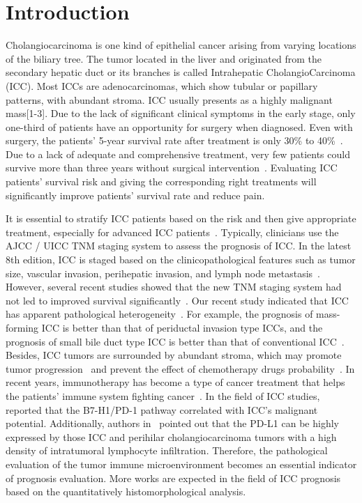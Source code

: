 \documentclass[num-refs]{wiley-article}
\begin{document}
\section{Introduction}

Cholangiocarcinoma is one kind of epithelial cancer arising from varying locations of the biliary tree. The tumor located in the liver and originated from the secondary hepatic duct or its branches is called Intrahepatic CholangioCarcinoma (ICC). Most ICCs are adenocarcinomas, which show tubular or papillary patterns, with abundant stroma. ICC usually presents as a highly malignant mass[1-3]. Due to the lack of significant clinical symptoms in the early stage, only one-third of patients have an opportunity for surgery when diagnosed. Even with surgery, the patients' 5-year survival rate after treatment is only 30\% to 40\%~\cite{mavros2014treatment, mazzaferro2020liver}. Due to a lack of adequate and comprehensive treatment, very few patients could survive more than three years without surgical intervention~\cite{kelley2020systemic}. Evaluating ICC patients' survival risk and giving the corresponding right treatments will significantly improve patients' survival rate and reduce pain.

It is essential to stratify ICC patients based on the risk and then give appropriate treatment, especially for advanced ICC patients~\cite{lunsford2018liver}. Typically, clinicians use the AJCC / UICC TNM staging system to assess the prognosis of ICC. In the latest 8th edition, ICC is staged based on the clinicopathological features such as tumor size, vascular invasion, perihepatic invasion, and lymph node metastasis~\cite{lunsford2018liver}. However, several recent studies showed that the new TNM staging system had not led to improved survival significantly~\cite{kang2018prognostic,kim2017evaluation}. Our recent study indicated that ICC has apparent pathological heterogeneity~\cite{chen2017clinicopathological}. For example, the prognosis of mass-forming ICC is better than that of periductal invasion type ICCs, and the prognosis of small bile duct type ICC is better than that of conventional ICC~\cite{chen2017clinicopathological,yu2011viral}. Besides, ICC tumors are surrounded by abundant stroma, which may promote tumor progression~\cite{mertens2013therapeutic} and prevent the effect of chemotherapy drugs probability~\cite{hogdall2018desmoplastic}. In recent years, immunotherapy has become a type of cancer treatment that helps the patients' immune system fighting cancer~\cite{2018A}. In the field of ICC studies, \cite{Ye2010Interaction} reported that the B7-H1/PD-1 pathway correlated with ICC's malignant potential.
Additionally, authors in~\cite{2017PD} pointed out that the PD-L1 can be highly expressed by those ICC and perihilar cholangiocarcinoma tumors with a high density of intratumoral lymphocyte infiltration. Therefore, the pathological evaluation of the tumor immune microenvironment becomes an essential indicator of prognosis evaluation. More works are expected in the field of ICC prognosis based on the quantitatively histomorphological analysis. 
\end{document}
